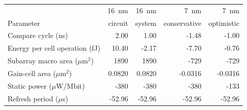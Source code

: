 \begin{tabular}{lrrrr}
\toprule
 & 16~nm & 16~nm & 7~nm & 7~nm \\
Parameter & circuit & system & conservative & optimistic \\
\midrule
Compare cycle (ns) & 2.00 & 1.00 & \hyp{1.48} & \hyp{1.00} \\
Energy per cell operation (fJ) & 10.40 & \hyp{2.17} & \hyp{7.70} & \hyp{0.76} \\
Subarray macro area ($\mu$m$^2$) & 1890 & 1890 & \hyp{729} & \hyp{729} \\
Gain-cell area ($\mu$m$^2$) & 0.0820 & 0.0820 & \hyp{0.0316} & \hyp{0.0316} \\
Static power ($\mu$W/Mbit) & \hyp{380} & \hyp{380} & \hyp{380} & \hyp{133} \\
Refresh period ($\mu$s) & \hyp{52.96} & \hyp{52.96} & \hyp{52.96} & \hyp{52.96} \\
\bottomrule
\end{tabular}
